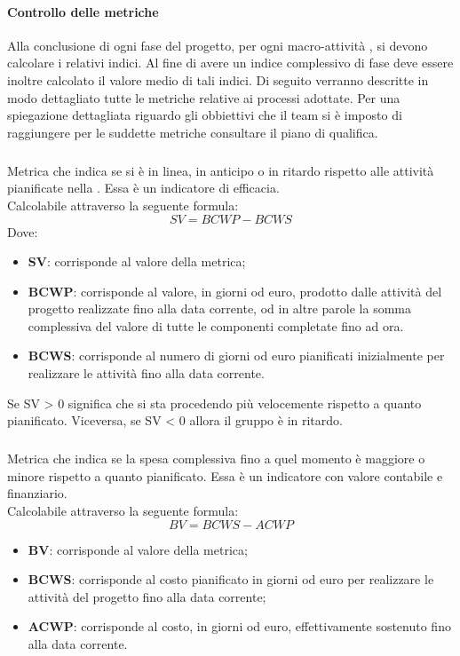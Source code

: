 \paragraph{Controllo delle metriche} \Spazio
Alla conclusione di ogni fase del progetto, per ogni macro-attività , si devono calcolare i relativi indici. Al fine di avere un indice complessivo di fase deve essere inoltre calcolato il valore medio
di tali indici. Di seguito verranno descritte in modo dettagliato tutte le metriche relative ai processi adottate. Per una spiegazione dettagliata riguardo gli obbiettivi che il team si è imposto di raggiungere per le suddette metriche consultare il piano di qualifica.
\subparagraph{}\Spazio
Metrica che indica se si è in linea, in anticipo o in ritardo rispetto alle attività pianificate nella . Essa è un indicatore di efficacia. \\
Calcolabile attraverso la seguente formula:
\[ SV=BCWP-BCWS\]
Dove:
\begin{itemize}
	\item {\textbf{SV}: corrisponde al valore della metrica;}
	\item {\textbf{BCWP}: corrisponde al valore, in giorni od euro, prodotto dalle attività del progetto realizzate fino alla data corrente, od in altre parole la somma complessiva del valore di tutte le componenti completate fino ad ora.}
	\item {\textbf{BCWS}: corrisponde al numero di giorni od euro pianificati inizialmente per realizzare le attività fino alla data corrente.}	
\end{itemize}
Se SV > 0 significa che si sta procedendo più velocemente rispetto a quanto pianificato. Viceversa, se SV < 0 allora il gruppo è in ritardo. 
\subparagraph{}\Spazio
Metrica che indica se la spesa complessiva fino a quel momento è maggiore o minore rispetto a quanto pianificato. Essa è un indicatore con valore contabile e finanziario. \\
Calcolabile attraverso la seguente formula:
\[BV=BCWS-ACWP\]
\begin{itemize}
	\item {\textbf{BV}: corrisponde al valore della metrica;}
	\item {\textbf{BCWS}: corrisponde al costo pianificato in giorni od euro per realizzare le attività del progetto fino alla data corrente;}
	\item {\textbf{ACWP}: corrisponde al costo, in giorni od euro, effettivamente sostenuto fino alla data corrente.}
\end{itemize}
